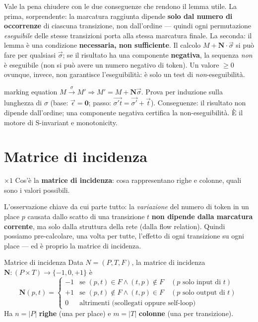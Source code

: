 Vale la pena chiudere con le due conseguenze che rendono il lemma utile. La prima, sorprendente: la marcatura raggiunta dipende \textbf{solo dal numero di occorrenze} di ciascuna transizione, non dall'ordine — quindi ogni permutazione \emph{eseguibile} delle stesse transizioni porta alla stessa marcatura finale. La seconda: il lemma è una condizione \textbf{necessaria, non sufficiente}. Il calcolo $M + \mathbf{N}\cdot\vec{\sigma}$ si può fare per qualsiasi $\vec{\sigma}$; se il risultato ha una componente \textbf{negativa}, la sequenza \emph{non} è eseguibile (non si può avere un numero negativo di token). Un valore $\ge 0$ ovunque, invece, non garantisce l'eseguibilità: è solo un test di \emph{non}-eseguibilità.

\begin{puntochiave}{marking equation}
$M\xrightarrow{\sigma}M' \Rightarrow M'=M+\mathbf{N}\vec\sigma$. Prova per induzione sulla lunghezza di $\sigma$ (base: $\vec\epsilon=\mathbf{0}$; passo: $\overrightarrow{\sigma't}=\vec{\sigma'}+\vec t$). Conseguenze: il risultato non dipende dall'ordine; una componente negativa certifica la non-eseguibilità. È il motore di S-invariant e monotonicity.
\end{puntochiave}

\section{Matrice di incidenza}

\begin{domanda}{$\times 1$}
Cos'è la \textbf{matrice di incidenza}: cosa rappresentano righe e colonne, quali sono i valori possibili.
\end{domanda}

L'osservazione chiave da cui parte tutto: la \emph{variazione} del numero di token in un place $p$ causata dallo scatto di una transizione $t$ \textbf{non dipende dalla marcatura corrente}, ma solo dalla struttura della rete (dalla flow relation). Quindi possiamo pre-calcolare, una volta per tutte, l'effetto di ogni transizione su ogni place — ed è proprio la matrice di incidenza.

\begin{definizione}{Matrice di incidenza}
Data $N=(P,T,F)$, la matrice di incidenza $\mathbf{N} : (P\times T) \to \{-1,0,+1\}$ è
$$\mathbf{N}(p,t) = \begin{cases}
-1 & \text{se } (p,t)\in F \wedge (t,p)\notin F \quad (p \text{ solo input di } t)\\
+1 & \text{se } (p,t)\notin F \wedge (t,p)\in F \quad (p \text{ solo output di } t)\\
0 & \text{altrimenti (scollegati oppure self-loop)}
\end{cases}$$
Ha $n=|P|$ \textbf{righe} (una per place) e $m=|T|$ \textbf{colonne} (una per transizione).
\end{definizione}

